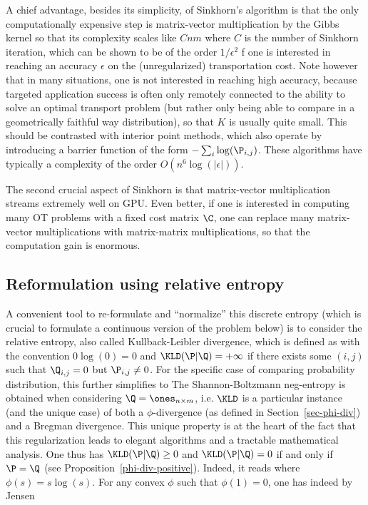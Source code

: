 A chief advantage, besides its simplicity, of Sinkhorn's algorithm is that the only computationally expensive step is matrix-vector multiplication by the Gibbs kernel so that its complexity scales like $C nm$ where $C$ is the number of Sinkhorn iteration, which can be shown to be of the order $1/\epsilon^2$ f one is interested in reaching an accuracy $\epsilon$ on the (unregularized) transportation cost. Note however that in many situations, one is not interested in reaching high accuracy, because targeted application success is often only remotely connected to the ability to solve an optimal transport problem (but rather only being able to compare in a geometrically faithful way distribution), so that $K$ is usually quite small.
%
This should be contrasted with interior point methods, which also operate by introducing a barrier function of the form $-\sum_i \log(\P_{i,j})$. These algorithms have typically a complexity of the order $O(n^6 \log(|\epsilon|))$. 

The second crucial aspect of Sinkhorn is that matrix-vector multiplication streams extremely well on GPU. Even better, if one is interested in computing many OT problems with a fixed cost matrix $\C$, one can replace many matrix-vector multiplications with matrix-matrix multiplications, so that the computation gain is enormous. 



\subsection{Reformulation using relative entropy}

A convenient tool to re-formulate and ``normalize'' this discrete entropy (which is crucial to formulate a continuous version of the problem below) is to consider the relative entropy, also called  Kullback-Leibler divergence, which is defined as
with the convention $0\log(0)=0$ and $\KLD(\P|\Q)=+\infty$ if there exists some $(i,j)$ such that $\Q_{i,j}=0$ but $\P_{i,j} \neq 0$. 
%
For the specific case of comparing probability distribution, this further simplifies to 
The Shannon-Boltzmann neg-entropy is obtained when considering $\Q=\ones_{n \times m}$, i.e.  
$\KLD$ is a particular instance (and the unique case) of both a $\phi$-divergence (as defined in Section~\ref{sec-phi-div}) and a Bregman divergence. This unique property is at the heart of the fact that this regularization leads to elegant algorithms and a tractable mathematical analysis. One thus has $\KLD(\P|\Q) \geq 0$ and  $\KLD(\P|\Q)=0$ if and only if $\P=\Q$ (see Proposition~\ref{phi-div-positive}).
%
Indeed, it reads
where $\phi(s)=s\log(s)$. For any convex $\phi$ such that $\phi(1)=0$, one has indeed by Jensen

